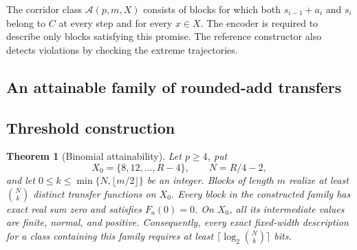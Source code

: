 \documentclass[11pt,reqno]{amsart}
\newtheorem{theorem}{Theorem}[section]
\theoremstyle{definition}
\theoremstyle{remark}
\numberwithin{equation}{section}
\begin{document}
The corridor class $\mathcal{A}(p,m,X)$ consists of blocks for which both
$s_{i-1}+a_i$ and $s_i$ belong to $C$ at every step and for every $x\in X$.
The encoder is required to describe only blocks satisfying this promise.
The reference constructor also detects violations by checking the extreme
trajectories.

\clearpage
\begin{samepage}
\section{An attainable family of rounded-add transfers}
\label{sec:threshold}

\subsection{Threshold construction}

\begin{theorem}[Binomial attainability]
\label{thm:binomial}
Let $p\geq 4$, put
\[
  X_0=\{8,12,\ldots,R-4\},\qquad N=R/4-2,
\]
and let $0\leq k\leq\min\{N,\lfloor m/2\rfloor\}$ be an integer.
Blocks of length $m$ realize at least $\binom Nk$ distinct transfer
functions on $X_0$. Every block in the constructed family has exact real
sum zero and satisfies $F_a(0)=0$. On $X_0$, all its intermediate values
are finite, normal, and positive. Consequently, every exact fixed-width
description for a class containing this family requires at least
$\lceil\log_2\binom Nk\rceil$ bits.
\end{theorem}
\end{samepage}
\end{document}
